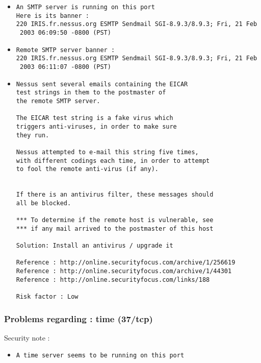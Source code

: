 \documentclass{article}
\begin{document}
\begin{itemize}
\item \begin{verbatim}
An SMTP server is running on this port
Here is its banner : 
220 IRIS.fr.nessus.org ESMTP Sendmail SGI-8.9.3/8.9.3; Fri, 21 Feb
 2003 06:09:50 -0800 (PST)
\end{verbatim}\item \begin{verbatim}
Remote SMTP server banner :
220 IRIS.fr.nessus.org ESMTP Sendmail SGI-8.9.3/8.9.3; Fri, 21 Feb
 2003 06:11:07 -0800 (PST)

\end{verbatim}\item \begin{verbatim}
Nessus sent several emails containing the EICAR
test strings in them to the postmaster of
the remote SMTP server.

The EICAR test string is a fake virus which
triggers anti-viruses, in order to make sure
they run.

Nessus attempted to e-mail this string five times,
with different codings each time, in order to attempt
to fool the remote anti-virus (if any).


If there is an antivirus filter, these messages should
all be blocked.

*** To determine if the remote host is vulnerable, see
*** if any mail arrived to the postmaster of this host

Solution: Install an antivirus / upgrade it

Reference : http://online.securityfocus.com/archive/1/256619
Reference : http://online.securityfocus.com/archive/1/44301
Reference : http://online.securityfocus.com/links/188

Risk factor : Low
\end{verbatim}\end{itemize}
\subsubsection{Problems regarding : time (37/tcp)}
Security note :\\
\begin{itemize}
\item \begin{verbatim}
A time server seems to be running on this port
\end{verbatim}\end{itemize}
\end{document}
